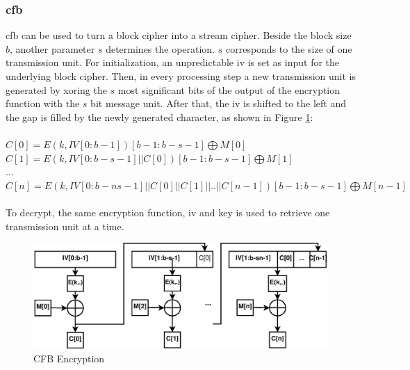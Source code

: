 \subsubsection{\gls{cfb}}
\gls{cfb} can be used to turn a block cipher into a stream cipher. Beside the block size $b$, another parameter $s$ determines the operation. $s$ corresponds
to the size of one transmission unit. For initialization, an unpredictable \gls{iv} is set as input for the underlying block cipher. Then, in every
processing step a new transmission unit is generated by \gls{xor}ing the $s$ most significant bits
of the output of the encryption function with the $s$ bit message unit. After that, the \gls{iv} is shifted to the left and the gap is filled
by the newly generated character, as shown in Figure \ref{fig:cfb}:
\\
\\
 $C[0] = E(k, IV[0:b-1])[b-1:b-s-1] \bigoplus M[0]$\\
 $C[1] = E(k, IV[0:b-s-1] || C[0])[b-1:b-s-1] \bigoplus M[1]$\\
 ... \\
 $C[n] = E(k, IV[0:b-ns-1] || C[0] || C[1] || .. || C[n-1])[b-1:b-s-1] \bigoplus M[n-1]$\\
\\

To decrypt, the same encryption function, \gls{iv} and key is used to retrieve one transmission unit at a time.
 
\begin{figure}
    \centering
    \includegraphics[width=1\textwidth]{figures/CFB.eps}
    \caption{CFB Encryption}
    \label{fig:cfb}
\end{figure}

